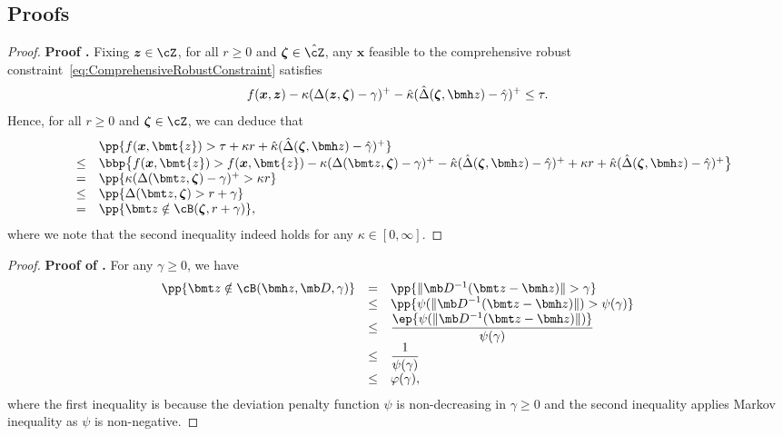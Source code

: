 \documentclass[opre, blindrev]{informs4}
\newcommand{\1}[1]{\mathds{1}{\left(#1\right)}}
\begin{document}
\newpage
\begin{appendices}

\section{Proofs}

\begin{proof}{\bf Proof .}
Fixing $\bm z \in \cZ$, for all $r \geq 0$ and $\bm \zeta  \in \hat \cZ$, any $\bm x$ feasible to the comprehensive robust constraint~\eqref{eq:ComprehensiveRobustConstraint} satisfies
\[
f(\bm x,\bm z) - \kappa (\Delta(\bm z,\bm \zeta) - \gamma)^+ - \hat \kappa (\hat \Delta(\bm \zeta,\bmh z) - \hat \gamma)^+ \leq \tau.
\]
Hence, for all $r \geq 0$ and $\bm \zeta  \in \cZ$, we can deduce that
$$
\begin{array}{rcl}
&& \pp{f(\bm{x},\bmt{z}) > \tau + \kappa r + \hat \kappa (\hat \Delta(\bm \zeta,\bmh z) - \hat \gamma)^+}\\
&\leq&  \bbp\big\{f(\bm{x},\bmt{z}) >  f(\bm{x}, \bmt{z}) - \kappa( \Delta(\bmt z,\bm \zeta) - \gamma)^+ - \hat\kappa(\hat \Delta(\bm \zeta,\bmh z) - \hat \gamma)^+  + \kappa r + \hat \kappa (\hat \Delta(\bm \zeta,\bmh z) - \hat \gamma)^+\big\}\\
& =& \pp{\kappa( \Delta(\bmt z,\bm \zeta) - \gamma)^+ > \kappa r} \\
&\leq & \pp{\Delta(\bmt z,\bm \zeta) > r+\gamma}\\
&=& \pp{\bmt z \notin \cB(\bm \zeta,r+\gamma)}, 
\end{array}
$$
where we note that the second inequality indeed holds for any $\kappa \in [0,\infty]$.
\hfill \Halmos
\end{proof}
\vspace{3mm}

\begin{proof}{\bf Proof of .}
For any $\gamma \geq 0$, we have
\[
\begin{array}{rcl}
\pp{\bmt z \notin \cB(\bmh z, \mb D, \gamma)} & = & \pp{ \|\mb D^{-1} (\bmt z - \bmh z) \| >\gamma} \\
& \leq & \displaystyle \pp{\psi(\|\mb D^{-1} (\bmt z - \bmh z) \|) > \psi(\gamma)} \\
& \leq & \displaystyle \frac{\ep{\psi(\|\mb D^{-1} (\bmt z - \bmh z)\|)}}{\psi(\gamma)} \\
& \leq & \displaystyle \dfrac{1}{\psi(\gamma)} \\
& \leq & \varphi(\gamma),
\end{array}
\]
where the first inequality is because the deviation penalty function $\psi$ is non-decreasing in $\gamma \geq 0$ and the second inequality applies Markov inequality as $\psi$ is non-negative. 
\hfill \Halmos
\end{proof}
\vspace{3mm}


\end{appendices}
\end{document}
